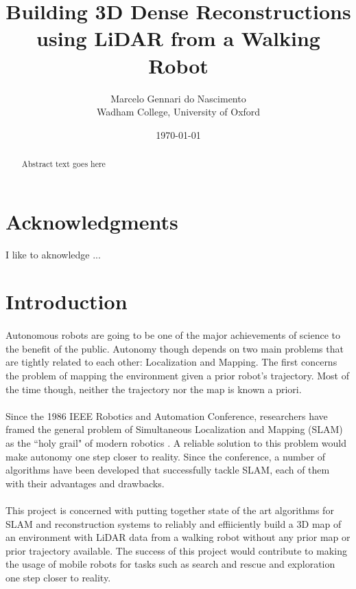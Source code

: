 \documentclass[11pt]{article}
\title{Building 3D Dense Reconstructions using LiDAR from a Walking Robot}
\author{Marcelo Gennari do Nascimento \\ Wadham College, University of Oxford}
\date{\today}
\begin{document}

	\maketitle

	\newpage
	\section*{Acknowledgments}
	\thispagestyle{empty}

	I like to aknowledge ...

	\clearpage
	\newpage

	\begin{abstract}
		Abstract text goes here
	\end{abstract}

	\newpage
	\tableofcontents

	\newpage
	\section{Introduction}
	\paragraph{}
	Autonomous robots are going to be one of the major achievements of science to the benefit of the public. Autonomy though depends on two main problems that are tightly related to each other: Localization and Mapping. The first concerns the problem of mapping the environment given a prior robot's trajectory. Most of the time though, neither the trajectory nor the map is known a priori.
	
	\paragraph{}
	Since the 1986 IEEE Robotics and Automation Conference, researchers have framed the general problem of Simultaneous Localization and Mapping (SLAM) as the ``holy grail" of modern robotics \cite{SLAMPartI}. A reliable solution to this problem would make autonomy one step closer to reality. Since the conference, a number of algorithms have been developed that successfully tackle SLAM, each of them with their advantages and drawbacks.

	\paragraph{}
	This project is concerned with putting together state of the art algorithms for SLAM and reconstruction systems to reliably and effiiciently build a 3D map of an environment with LiDAR data from a walking robot without any prior map or prior trajectory available. The success of this project would contribute to making the usage of mobile robots for tasks such as search and rescue and exploration one step closer to reality.
\end{document}
